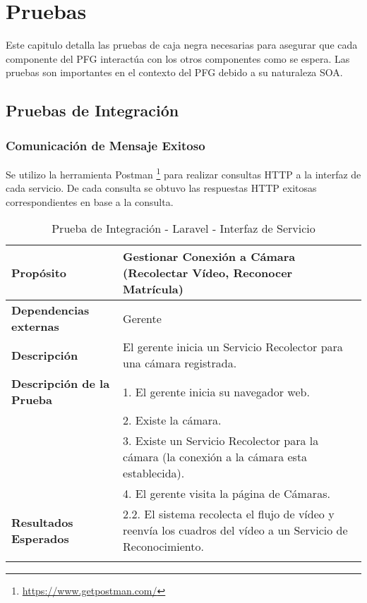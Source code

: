 \chapter{Pruebas}
Este capitulo detalla las pruebas de caja negra necesarias para asegurar que cada componente del PFG interactúa con los otros componentes como se espera. Las pruebas son importantes en el contexto del PFG debido a su naturaleza SOA.
\pagebreak
\section{Pruebas de Integración}

\subsection{Comunicación de Mensaje Exitoso}
Se utilizo la herramienta Postman \footnote{\url{https://www.getpostman.com/}} para realizar consultas HTTP a la interfaz de cada servicio.
De cada consulta se obtuvo las respuestas HTTP exitosas correspondientes en base a la consulta.
\
\begin{longtable}{@{} p{3cm} p{10cm} @{}} \toprule
\textbf{Propósito}                  & Gestionar Conexión a Cámara (Recolectar Vídeo, Reconocer Matrícula) \\ \midrule
\textbf{Dependencias externas}      & Gerente \\ \cmidrule{1-2}
\textbf{Descripción}                & El gerente inicia un Servicio Recolector para una cámara registrada. \\ \cmidrule{1-2}
\textbf{Descripción de la Prueba}   & 1. El gerente inicia su navegador web. \\ 
                                    & 2. Existe la cámara. \\
                                    & 3. Existe un Servicio Recolector para la cámara (la conexión a la cámara esta establecida). \\
                                    & 4. El gerente visita la página de Cámaras.  \\ \cmidrule{1-2} 
\textbf{Resultados Esperados}       & 2.2. El sistema recolecta el flujo de vídeo y reenvía los cuadros del vídeo a un Servicio de Reconocimiento. \\ \bottomrule
\caption{Prueba de Integración - Laravel - Interfaz de Servicio} \label{tab:tabcu-rec}  \\
\end{longtable}
   
\pagebreak
